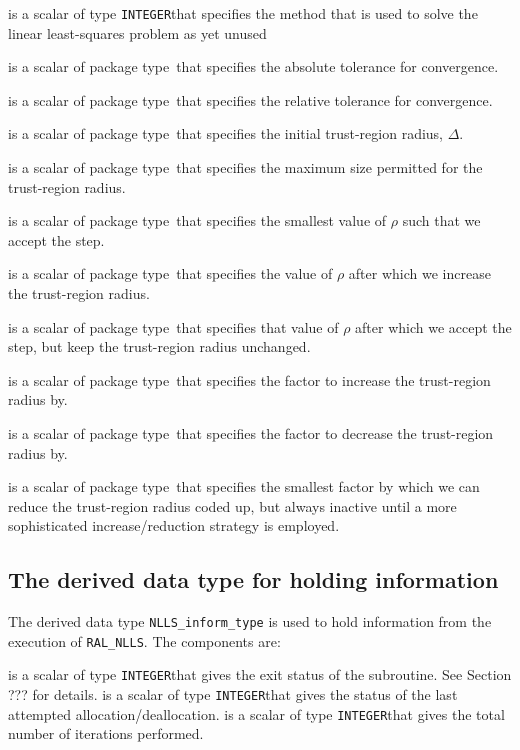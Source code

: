\documentclass{hslspec}
\newcommand{\scalarinteger}{is a scalar of type {\tt INTEGER}}
\newcommand{\scalarreal}{is a scalar of package type\ }
\begin{document}
\begin{description}
\begin{description}
 \scalarinteger that specifies the method that is used to solve the linear least-squares problem {\color{red} as yet unused}

 \scalarreal that specifies the absolute tolerance for convergence.

 \scalarreal that specifies the relative tolerance for convergence.

 \scalarreal that specifies the initial trust-region radius, $\Delta$.

 \scalarreal that specifies the maximum size permitted for the trust-region radius.

 \scalarreal that specifies the smallest value of $\rho$ such that we accept the step.  

 \scalarreal that specifies the value of $\rho$ after which we increase the trust-region radius.

 \scalarreal that specifies that value of $\rho$ after which we accept the step, but keep the trust-region radius unchanged.

 \scalarreal that specifies the factor to increase the trust-region radius by.

 \scalarreal that specifies the factor to decrease the trust-region radius by.

 \scalarreal that specifies the smallest factor by which we can reduce the trust-region radius {\color{red} coded up, but always inactive until a more sophisticated increase/reduction strategy is employed}.

\end{description}


\subsection{The derived data type for holding information}
\label{typeinform} 
The derived data type {\tt NLLS\_inform\_type} is used
to hold information from the execution of {\tt RAL\_NLLS}.
The components are:
\begin{description}
 \scalarinteger that gives the exit status of the subroutine.  See Section {\color{red} ???} for details.
 \scalarinteger that gives the status of the last attempted allocation/deallocation.
 \scalarinteger that gives the total number of iterations performed.
\end{description}


\end{description}
\end{document}
